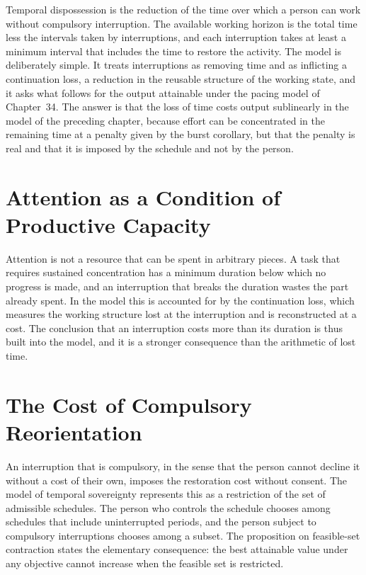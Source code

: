 \documentclass[11pt,letterpaper]{report}
\theoremstyle{plain}
\theoremstyle{definition}
\theoremstyle{remark}
\begin{document}
Temporal dispossession is the reduction of the time over which a person can work without compulsory interruption. The available working horizon is the total time less the intervals taken by interruptions, and each interruption takes at least a minimum interval that includes the time to restore the activity. The model is deliberately simple. It treats interruptions as removing time and as inflicting a continuation loss, a reduction in the reusable structure of the working state, and it asks what follows for the output attainable under the pacing model of Chapter~34. The answer is that the loss of time costs output sublinearly in the model of the preceding chapter, because effort can be concentrated in the remaining time at a penalty given by the burst corollary, but that the penalty is real and that it is imposed by the schedule and not by the person.

\section{Attention as a Condition of Productive Capacity}

Attention is not a resource that can be spent in arbitrary pieces. A task that requires sustained concentration has a minimum duration below which no progress is made, and an interruption that breaks the duration wastes the part already spent. In the model this is accounted for by the continuation loss, which measures the working structure lost at the interruption and is reconstructed at a cost. The conclusion that an interruption costs more than its duration is thus built into the model, and it is a stronger consequence than the arithmetic of lost time.

\section{The Cost of Compulsory Reorientation}

An interruption that is compulsory, in the sense that the person cannot decline it without a cost of their own, imposes the restoration cost without consent. The model of temporal sovereignty represents this as a restriction of the set of admissible schedules. The person who controls the schedule chooses among schedules that include uninterrupted periods, and the person subject to compulsory interruptions chooses among a subset. The proposition on feasible-set contraction states the elementary consequence: the best attainable value under any objective cannot increase when the feasible set is restricted.
\end{document}
